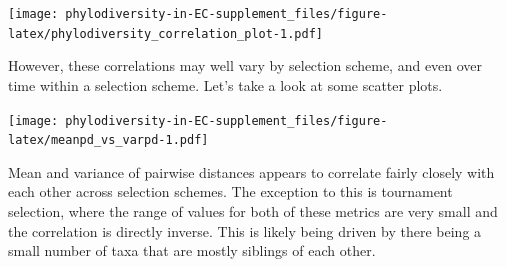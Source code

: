 \documentclass[]{book}
\newenvironment{Shaded}{\begin{snugshade}}{\end{snugshade}}
\newcommand{\DataTypeTok}[1]{\textcolor[rgb]{0.13,0.29,0.53}{#1}}
\newcommand{\DecValTok}[1]{\textcolor[rgb]{0.00,0.00,0.81}{#1}}
\newcommand{\KeywordTok}[1]{\textcolor[rgb]{0.13,0.29,0.53}{\textbf{#1}}}
\newcommand{\NormalTok}[1]{#1}
\newcommand{\OperatorTok}[1]{\textcolor[rgb]{0.81,0.36,0.00}{\textbf{#1}}}
\newcommand{\StringTok}[1]{\textcolor[rgb]{0.31,0.60,0.02}{#1}}
\begin{document}
\texttt{[image: phylodiversity-in-EC-supplement\_files/figure-latex/phylodiversity\_correlation\_plot-1.pdf]}

However, these correlations may well vary by selection scheme, and even over time within a selection scheme. Let's take a look at some scatter plots.

\begin{Shaded}
\end{Shaded}

\texttt{[image: phylodiversity-in-EC-supplement\_files/figure-latex/meanpd\_vs\_varpd-1.pdf]}

Mean and variance of pairwise distances appears to correlate fairly closely with each other across selection schemes. The exception to this is tournament selection, where the range of values for both of these metrics are very small and the correlation is directly inverse. This is likely being driven by there being a small number of taxa that are mostly siblings of each other.
\end{document}
